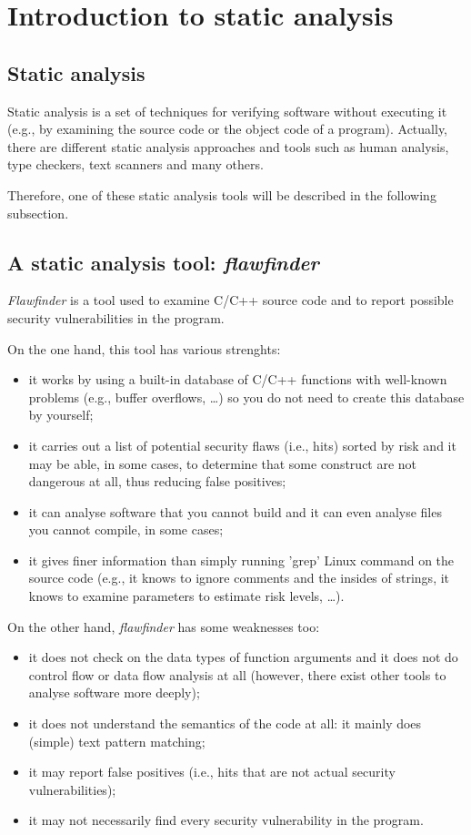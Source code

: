 \section{Introduction to static analysis}

\subsection{Static analysis}
Static analysis is a set of techniques for verifying software without executing it (e.g., by examining the source code or the object code of a program).
Actually, there are different static analysis approaches and tools such as human analysis, type checkers, text scanners and many others.

Therefore, one of these static analysis tools will be described in the following subsection.

\subsection{A static analysis tool:  \textit{flawfinder}}
\textit{Flawfinder}\parencite{flawfinder} is a tool used to examine C/C++ source code and to report possible security vulnerabilities in the program.

On the one hand, this tool has various strenghts:
\begin{itemize}[itemsep=1.5pt]
    \item it works by using a built-in database of C/C++ functions with well-known problems (e.g., buffer overflows, \ldots) so you do not need to create this database by yourself;
    \item it carries out a list of potential security flaws (i.e., hits) sorted by risk and it may be able, in some cases, to determine that some construct are not dangerous at all, thus reducing false positives; 
    \item it can analyse software that you cannot build and it can even analyse files you cannot compile, in some cases;
    \item it gives finer information than simply running 'grep'\parencite{grep} Linux command on the source code (e.g., it knows to ignore comments and the insides of strings, it knows to examine parameters to estimate risk levels, \ldots).
\end{itemize}

On the other hand, \textit{flawfinder} has some weaknesses too:
\begin{itemize}[itemsep=1.5pt]
    \item it does not check on the data types of function arguments and it does not do control flow or data flow analysis at all (however, there exist other tools to analyse software more deeply);
    \item it does not understand the semantics of the code at all: it mainly does (simple) text pattern matching;
    \item it may report false positives (i.e., hits that are not actual security vulnerabilities);
    \item it may not necessarily find every security vulnerability in the program.
\end{itemize}

